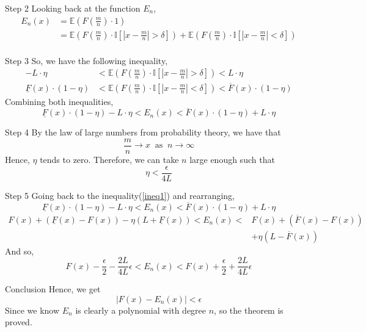 \documentclass[mathserif,serif]{beamer}
\begin{document}
\begin{frame}{Step 2}
Looking back at the function $E_n$,
\begin{align*}
    E_n(x) &= \mathbb{E}\left(F\left(\frac{m}{n}\right)\cdot1\right) \\
    &= \mathbb{E}\left(F\left(\frac{m}{n}\right)\cdot \mathbb{I}\left[|x-\frac{m}{n}|>\delta\right]\right) + \mathbb{E}\left(F\left(\frac{m}{n}\right)\cdot \mathbb{I}\left[|x-\frac{m}{n}|<\delta\right]\right)\\
\end{align*}
\end{frame}

\begin{frame}{Step 3}
So, we have the following inequality,
\begin{align*}
    -L\cdot\eta&<\mathbb{E}\left(F\left(\frac{m}{n}\right)\cdot \mathbb{I}\left[|x-\frac{m}{n}|>\delta\right]\right)<L\cdot\eta\\
    \underline{F}(x)\cdot(1-\eta)&<\mathbb{E}\left(F\left(\frac{m}{n}\right)\cdot \mathbb{I}\left[|x-\frac{m}{n}|<\delta\right]\right)<\overline{F}(x)\cdot (1-\eta)
\end{align*}
Combining both inequalities, 
\begin{equation}\label{ineq1}
 \underline{F}(x)\cdot(1-\eta)-L\cdot\eta<E_n(x)<\overline{F}(x)\cdot (1-\eta)+L\cdot\eta 
\end{equation}
\end{frame}

\begin{frame}{Step 4}
By the law of large numbers from probability theory, we have that
\begin{equation*}
    \frac{m}{n}\longrightarrow x \;\;\text{as}\;\;n \rightarrow \infty
\end{equation*}
Hence, $\eta$ tends to zero.
\newline
Therefore, we can take $n$ large enough such that 
\begin{equation*}
\eta<\frac{\epsilon}{4L}
\end{equation*}
\end{frame}

\begin{frame}{Step 5}
Going back to the inequality(\ref{ineq1}) and rearranging,
\begin{equation*}
 \underline{F}(x)\cdot(1-\eta)-L\cdot\eta<E_n(x)<\overline{F}(x)\cdot (1-\eta)+L\cdot\eta 
\end{equation*}
\begin{align*}
    F(x)+(\underline{F}(x)-F(x))-\eta(L+\underline{F}(x))<E_n(x)< &F(x)+(\overline{F}(x)-F(x))\\
    &+\eta(L-\overline{F}(x))
\end{align*}
And so,
\begin{equation*}
    F(x)-\frac{\epsilon}{2}-\frac{2L}{4L}\epsilon<E_n(x)<F(x)+\frac{\epsilon}{2}+\frac{2L}{4L}\epsilon
\end{equation*}
\end{frame}

\begin{frame}{Conclusion}
Hence, we get
\begin{equation*}
    |F(x)-E_n(x)|<\epsilon
\end{equation*}
Since we know $E_n$ is clearly a polynomial with degree $n$, so the theorem is proved.
\end{frame}
\end{document}
